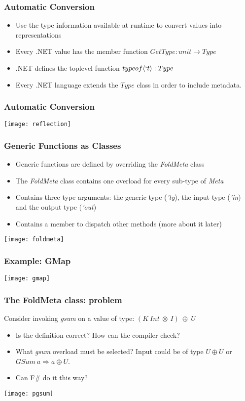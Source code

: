 \documentclass{beamer}
\begin{document}
\begin{frame}

  \frametitle{Automatic Conversion}

  \begin{itemize}

  \item Use the type information available at runtime to convert values into representations
  \item Every .NET value has the member function $GetType : unit \rightarrow Type$
  \item .NET defines the toplevel function $typeof\langle `t \rangle : Type$
  \item Every .NET language extends the $Type$ class in order to
    include metadata.
    
  \end{itemize}
\end{frame}

\begin{frame}
  \frametitle{Automatic Conversion}
  \centering\texttt{[image: reflection]}
\end{frame}

\begin{frame}

  \frametitle{Generic Functions as Classes}

  \begin{itemize}
  \item Generic functions are defined by overriding the
    \emph{FoldMeta} class
  \item The \emph{FoldMeta} class contains one overload for every
    sub-type of \emph{Meta}
  \item Contains three type arguments: the generic type (\emph{'ty}),
    the input type (\emph{'in}) and the output type (\emph{'out})
  \item Contains a member to dispatch other methods (more about it later)
  \end{itemize}
  
  \centering\texttt{[image: foldmeta]}
  
\end{frame}

\begin{frame}
  \frametitle{Example: GMap}
  \texttt{[image: gmap]}
\end{frame}

\begin{frame}
  \frametitle{The FoldMeta class: problem} Consider invoking
  \emph{gsum} on a value of type: $(K\ Int\ \otimes\ I)\ \oplus\ U$
  \begin{itemize}
  \item Is the definition correct? How can the compiler check?
  \item What \emph{gsum} overload must be selected? Input could be of
    type $U \oplus U$ or $GSum\ a \Rightarrow a \oplus U$.
  \item Can F\# do it this way?
  \end{itemize}
  \centering\texttt{[image: pgsum]}
\end{frame}
\end{document}
